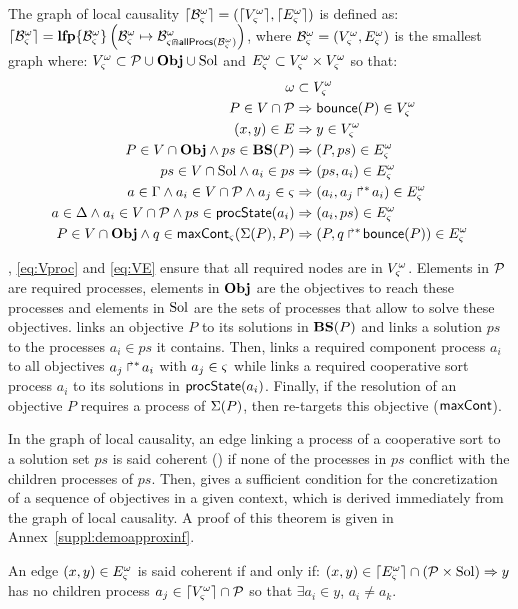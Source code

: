 \begin{definition}
\label{def:glc}
  The graph of local causality $\lceil \mathcal{B}_\varsigma^\omega\rceil = (\lceil V_\varsigma^\omega\rceil, \lceil E_\varsigma^\omega\rceil)$ is defined as: $\lceil \mathcal{B}_\varsigma^\omega\rceil = \mathbf{lfp}\{\mathcal{B}^\omega_\varsigma\}\left(\mathcal{B}^\omega_\varsigma\mapsto\mathcal{B}^\omega_{\varsigma \Cap \mathsf{allProcs}(\mathcal{B}^\omega_\varsigma)}\right)$,
  where $\mathcal{B}^\omega_\varsigma = (V_\varsigma^\omega, E_\varsigma^\omega)$ is the smallest graph where:
  $V_\varsigma^\omega \subset \mathcal{P} \cup \mathbf{Obj} \cup \mathrm{Sol}$ and $E_\varsigma^\omega \subset V_\varsigma^\omega \times V_\varsigma^\omega$
  so that:
  \begin{align}
    \omega &\subset V_\varsigma^\omega \label{eq:Vw} \\
    P \in V \cap \mathcal{P} &\Rightarrow \mathsf{bounce}(P) \in V_\varsigma^\omega \label{eq:Vproc} \\
    (x, y) \in E &\Rightarrow y \in V_\varsigma^\omega \label{eq:VE} \\
    P \in V \cap \mathbf{Obj} \wedge ps \in \mathbf{BS}(P) &\Rightarrow (P, ps) \in E_\varsigma^\omega \label{eq:ESol1} \\
    ps \in V \cap \mathrm{Sol} \wedge a_i \in ps &\Rightarrow (ps, a_i) \in E_\varsigma^\omega \label{eq:ESol2} \\
    a \in \Gamma \wedge a_i \in V \cap \mathcal{P} \wedge a_j \in \varsigma &\Rightarrow (a_i, \mbox{${a}_{j}\Rsh^*\!{a}_{i}$}) \in E_\varsigma^\omega \label{eq:EReq} \\
    a \in \Delta \wedge a_i \in V \cap \mathcal{P} \wedge ps \in \mathsf{procState}(a_i) &\Rightarrow (a_i, ps) \in E_\varsigma^\omega \label{eq:EPrio} \\
    P \in V \cap \mathbf{Obj} \wedge q \in \mathsf{maxCont}_\varsigma(\Sigma(P), P) &\Rightarrow (P, \mbox{$q\Rsh^*\!\mathsf{bounce}(P)$}) \in E_\varsigma^\omega \label{eq:ECont}
  \end{align}
\end{definition}

, \eqref{eq:Vproc} and \eqref{eq:VE} ensure that all required nodes are in $V_\varsigma^\omega$.
Elements in $\mathcal{P}$ are required processes,
elements in $\mathbf{Obj}$ are the objectives to reach these processes
and elements in $\mathrm{Sol}$ are the sets of processes that allow to solve these objectives.
 links an objective $P$ to its solutions in $\mathbf{BS}(P)$
and  links a solution $ps$ to the processes $a_i \in ps$ it contains.
Then,  links a required component process $a_i$ to all objectives $\mbox{${a}_{j}\Rsh^*\!{a}_{i}$}$ with $a_j \in \varsigma$
while  links a required cooperative sort process $a_i$ to its solutions in $\mathsf{procState}(a_i)$.
Finally, if the resolution of an objective $P$ requires a process of $\Sigma(P)$, then  re-targets this objective ($\mathsf{maxCont}$).


In the graph of local causality, an edge linking a process of a cooperative sort to a solution set $ps$ is said coherent () if none of the processes in $ps$ conflict with the children processes of $ps$.
Then,  gives a sufficient condition for the concretization of a sequence of objectives in a given context,
which is derived immediately from the graph of local causality.
A proof of this theorem is given in Annex~\ref{suppl:demoapproxinf}.
\begin{definition}
\label{def:coherent}
  An edge $(x, y) \in E_\varsigma^\omega$ is said coherent if and only if:
  $(x, y) \in \lceil E_\varsigma^\omega\rceil \cap (\mathcal{P} \times \mathrm{Sol}) \Rightarrow y$ has no children process $a_j \in \lceil V_\varsigma^\omega\rceil \cap \mathcal{P}$ so that $\exists a_i \in y$, $a_i \neq a_k$.
\end{definition}

